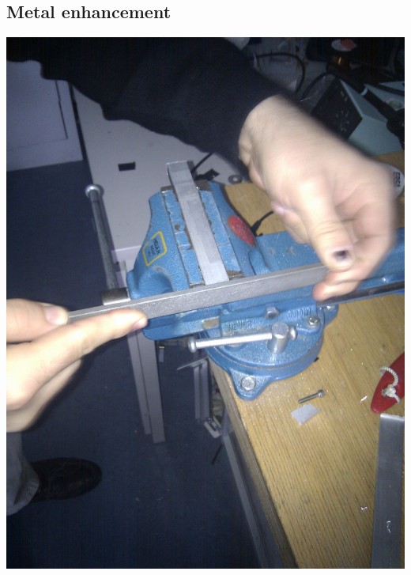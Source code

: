 \documentclass[pdf]{beamer}
\begin{document}
\subsection{Metal enhancement}

\begin{frame}
  \begin{center}
  \includegraphics[width = \textwidth]{pics/raw/feilen.jpg}
  \end{center}
\end{frame}
\end{document}
